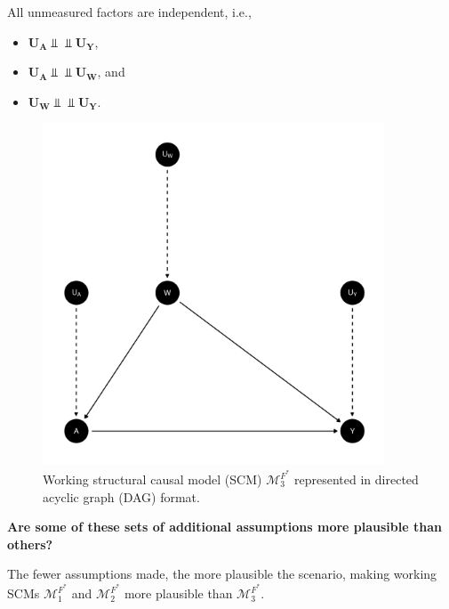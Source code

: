 \documentclass{article}\usepackage[]{graphicx}\usepackage[]{xcolor}
\newenvironment{knitrout}{}{} %
\begin{document}
\begin{enumerate}[label=\textbf{\arabic*.}]
\begin{enumerate}[label=\textbf{(\alph*)}]
\begin{itemize}
  All unmeasured factors are independent, i.e., 
  
  \begin{itemize} 
  
    \item $\bm{U_A} \Perp \!\!\!\! \Perp \bm{U_Y}$,
    
    \item $\bm{U_A} \Perp \!\!\!\! \Perp \bm{U_W}$, and
    
    \item $\bm{U_W} \Perp \!\!\!\! \Perp \bm{U_Y}$.
    
  \end{itemize}
  
\begin{figure}
  \caption{Working structural causal model (SCM) $\mathcal{M}^{F^*}_3$ represented in directed acyclic graph (DAG) format.}
  \centering
    
\begin{knitrout}
\color{fgcolor}
\includegraphics[width=4in]{figure/unnamed-chunk-5-1} 

\end{knitrout}

\end{figure}

\end{itemize}

\pagebreak
 
\textbf{Are some of these sets of additional assumptions more plausible than others?}

The fewer assumptions made, the more plausible the scenario, making working SCMs $\mathcal{M}^{F^*}_1$ and $\mathcal{M}^{F^*}_2$ more plausible than $\mathcal{M}^{F^*}_3$. 


\end{enumerate}
\end{enumerate}
\end{document}
